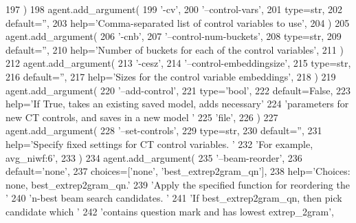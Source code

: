 \begin{DoxyCode}
197         )
198         agent.add\_argument(
199             \textcolor{stringliteral}{'-cv'},
200             \textcolor{stringliteral}{'--control-vars'},
201             type=str,
202             default=\textcolor{stringliteral}{''},
203             help=\textcolor{stringliteral}{'Comma-separated list of control variables to use'},
204         )
205         agent.add\_argument(
206             \textcolor{stringliteral}{'-cnb'},
207             \textcolor{stringliteral}{'--control-num-buckets'},
208             type=str,
209             default=\textcolor{stringliteral}{''},
210             help=\textcolor{stringliteral}{'Number of buckets for each of the control variables'},
211         )
212         agent.add\_argument(
213             \textcolor{stringliteral}{'-cesz'},
214             \textcolor{stringliteral}{'--control-embeddingsize'},
215             type=str,
216             default=\textcolor{stringliteral}{''},
217             help=\textcolor{stringliteral}{'Sizes for the control variable embeddings'},
218         )
219         agent.add\_argument(
220             \textcolor{stringliteral}{'--add-control'},
221             type=\textcolor{stringliteral}{'bool'},
222             default=\textcolor{keyword}{False},
223             help=\textcolor{stringliteral}{'If True, takes an existing saved model, adds necessary'}
224             \textcolor{stringliteral}{'parameters for new CT controls, and saves in a new model '}
225             \textcolor{stringliteral}{'file'},
226         )
227         agent.add\_argument(
228             \textcolor{stringliteral}{'--set-controls'},
229             type=str,
230             default=\textcolor{stringliteral}{''},
231             help=\textcolor{stringliteral}{'Specify fixed settings for CT control variables. '}
232             \textcolor{stringliteral}{'For example, avg\_niwf:6'},
233         )
234         agent.add\_argument(
235             \textcolor{stringliteral}{'--beam-reorder'},
236             default=\textcolor{stringliteral}{'none'},
237             choices=[\textcolor{stringliteral}{'none'}, \textcolor{stringliteral}{'best\_extrep2gram\_qn'}],
238             help=\textcolor{stringliteral}{'Choices: none, best\_extrep2gram\_qn.'}
239             \textcolor{stringliteral}{'Apply the specified function for reordering the '}
240             \textcolor{stringliteral}{'n-best beam search candidates. '}
241             \textcolor{stringliteral}{'If best\_extrep2gram\_qn, then pick candidate which '}
242             \textcolor{stringliteral}{'contains question mark and has lowest extrep\_2gram'},

\end{DoxyCode}
